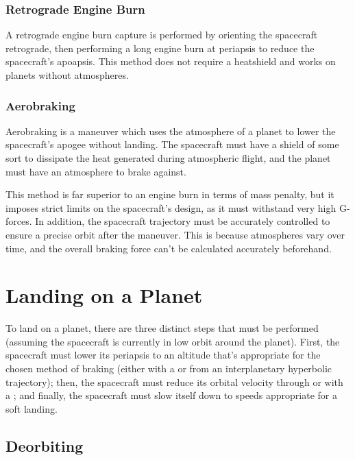 \subsubsection{Retrograde Engine Burn}

A retrograde engine burn capture is performed by orienting the
spacecraft retrograde, then performing a long engine burn at periapsis
to reduce the spacecraft's apoapsis. This method does not require a
heatshield and works on planets without atmospheres.

\subsubsection{Aerobraking}

Aerobraking is a maneuver which uses the atmosphere of a planet to
lower the spacecraft's apogee without landing. The spacecraft must
have a shield of some sort to dissipate the heat generated during
atmospheric flight, and the planet must have an atmosphere to brake
against.

This method is far superior to an engine burn in terms of mass
penalty, but it imposes strict limits on the spacecraft's design, as
it must withstand very high G-forces. In addition, the spacecraft
trajectory must be accurately controlled to ensure a precise orbit
after the maneuver. This is because atmospheres vary over time, and
the overall braking force can't be calculated accurately beforehand.

\section{Landing on a Planet}

To land on a planet, there are three distinct steps that must be
performed (assuming the spacecraft is currently in low orbit around
the planet).
%
First, the spacecraft must lower its periapsis to an altitude that's
appropriate for the chosen method of braking (either with a
 or from an interplanetary
hyperbolic trajectory);
%
then, the spacecraft must reduce its orbital velocity through
 or with a
;
%
and finally, the spacecraft must slow itself down to speeds
appropriate for a soft landing.

\subsection{Deorbiting}

